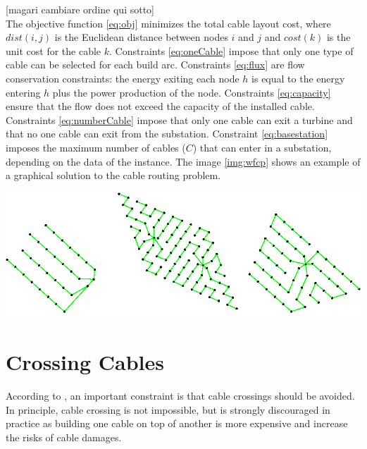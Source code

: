 [magari cambiare ordine qui sotto]\\
The objective function \ref{eq:obj} minimizes the total cable layout cost, where $dist(i, j)$ is the Euclidean distance between nodes $i$ and $j$ and $cost(k)$ is the unit cost for the cable $k$. 
Constraints \ref{eq:oneCable} impose that only one type of cable can be selected for each build arc.
Constraints \ref{eq:flux} are flow conservation constraints: the energy exiting each node $h$ is equal to the energy entering $h$ plus the power production of the node. 
Constraints \ref{eq:capacity} ensure that the flow does not exceed the capacity of the installed cable.
Constraints \ref{eq:numberCable} impose that only one cable can exit a turbine and that no one cable can exit from the substation. 
Constraint \ref{eq:basestation} imposes the maximum number of cables ($C$) that can enter in a substation, depending on the data of the instance. The image \ref{img:wfcp} shows an example of a graphical solution to the cable routing problem.

\begin{center}
	\includegraphics[scale=0.4]{Graphics/wfcp.png}
	\label{img:wfcp}
\end{center}
	
\section{Crossing Cables}
According to \cite{wfcp}, an important constraint is that cable crossings should be avoided. In principle, cable crossing is not impossible, but is strongly discouraged in practice as building one cable on top of another is more expensive and increase the risks of cable damages.\\

